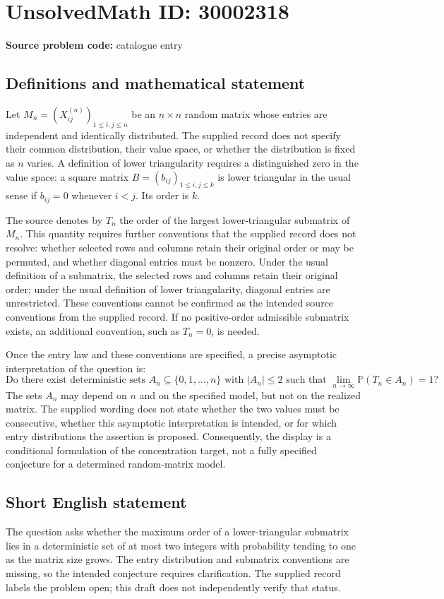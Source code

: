 \documentclass[11pt]{article}
\begin{document}
\section*{UnsolvedMath ID: 30002318}
\textbf{Source problem code:} catalogue entry
\subsection{Definitions and mathematical statement}
Let \(M_n=(X_{ij}^{(n)})_{1\leq i,j\leq n}\) be an \(n\times n\) random matrix whose entries are independent and identically distributed. The supplied record does not specify their common distribution, their value space, or whether the distribution is fixed as \(n\) varies. A definition of lower triangularity requires a distinguished zero in the value space: a square matrix \(B=(b_{ij})_{1\leq i,j\leq k}\) is lower triangular in the usual sense if \(b_{ij}=0\) whenever \(i<j\). Its order is \(k\).

The source denotes by \(T_n\) the order of the largest lower-triangular submatrix of \(M_n\). This quantity requires further conventions that the supplied record does not resolve: whether selected rows and columns retain their original order or may be permuted, and whether diagonal entries must be nonzero. Under the usual definition of a submatrix, the selected rows and columns retain their original order; under the usual definition of lower triangularity, diagonal entries are unrestricted. These conventions cannot be confirmed as the intended source conventions from the supplied record. If no positive-order admissible submatrix exists, an additional convention, such as \(T_n=0\), is needed.

Once the entry law and these conventions are specified, a precise asymptotic interpretation of the question is:
\[
\text{Do there exist deterministic sets }A_n\subseteq\{0,1,\ldots,n\}
\text{ with }|A_n|\leq 2
\text{ such that }
\lim_{n\to\infty}\mathbb{P}(T_n\in A_n)=1?
\]
The sets \(A_n\) may depend on \(n\) and on the specified model, but not on the realized matrix. The supplied wording does not state whether the two values must be consecutive, whether this asymptotic interpretation is intended, or for which entry distributions the assertion is proposed. Consequently, the display is a conditional formulation of the concentration target, not a fully specified conjecture for a determined random-matrix model.
\subsection{Short English statement}
The question asks whether the maximum order of a lower-triangular submatrix lies in a deterministic set of at most two integers with probability tending to one as the matrix size grows. The entry distribution and submatrix conventions are missing, so the intended conjecture requires clarification. The supplied record labels the problem open; this draft does not independently verify that status.
\end{document}
